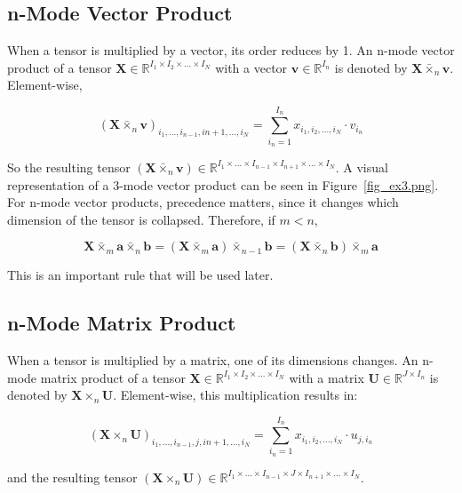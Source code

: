 \documentclass[twocolumn,10pt]{asme2ej}
\begin{document}
\subsection{n-Mode Vector Product}

When a tensor is multiplied by a vector, its order reduces by 1. An n-mode vector product of a tensor $\bm{X} \in \mathbb{R}^{I_1 \times I_2 \times ... \times I_N}$ with a vector $\bm{v} \in \mathbb{R}^{I_n}$ is denoted by $\bm{X} \bar{\times}_n \bm{v}$. Element-wise,

\begin{equation}
(\bm{X} \bar{\times}_n \bm{v} )_{i_1, ..., i_{n-1}, i{n+1}, ..., i_N} = \sum_{i_n = 1}^{I_n} x_{i_1, i_2, ..., i_N}\cdot v_{i_n}
\end{equation}

So the resulting tensor $(\bm{X} \bar{\times}_n \bm{v} ) \in \mathbb{R}^{I_1 \times ... \times I_{n-1} \times I_{n+1} \times ... \times I_N}$. A visual representation of a 3-mode vector product can be seen in Figure~\ref{fig_ex3.png}.
For n-mode vector products, precedence matters, since it changes which dimension of the tensor is collapsed. Therefore, if $m < n$,

\begin{equation}
\bm{X} \bar{\times}_m \bm{a} \bar{\times}_n \bm{b} = (\bm{X} \bar{\times}_m \bm{a}) \bar{\times}_{n-1} \bm{b} = (\bm{X} \bar{\times}_n \bm{b}) \bar{\times}_m \bm{a}
\label{eq_vectorMode}
\end{equation}

This is an important rule that will be used later.

\subsection{n-Mode Matrix Product}
When a tensor is multiplied by a matrix, one of its dimensions changes. An n-mode matrix product of a tensor $\bm{X} \in \mathbb{R}^{I_1 \times I_2 \times ... \times I_N}$ with a matrix $\bm{U} \in \mathbb{R}^{J \times I_n}$ is denoted by $\bm{X} \times_n \bm{U}$. Element-wise, this multiplication results in:

\begin{equation}
(\bm{X} \times_n \bm{U} )_{i_1, ..., i_{n-1}, j, i{n+1}, ..., i_N} = \sum_{i_n = 1}^{I_n} x_{i_1, i_2, ..., i_N}\cdot u_{j,i_n}
\end{equation}

\noindent and the resulting tensor $(\bm{X} \times_n \bm{U} ) \in \mathbb{R}^{I_1 \times ... \times I_{n-1} \times J \times I_{n+1} \times ... \times I_N}$.
\end{document}
